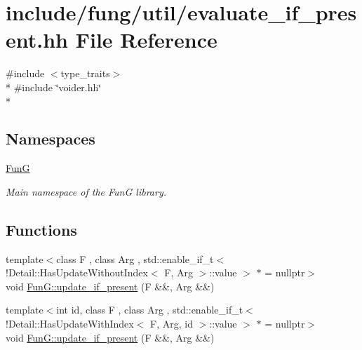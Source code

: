 \hypertarget{evaluate__if__present_8hh}{\section{include/fung/util/evaluate\-\_\-if\-\_\-present.hh File Reference}
\label{evaluate__if__present_8hh}
}
{\ttfamily \#include $<$type\-\_\-traits$>$}\\*
{\ttfamily \#include \char`\"{}voider.\-hh\char`\"{}}\\*
\subsection*{Namespaces}
\begin{DoxyCompactItemize}
\item 
\hyperlink{namespaceFunG}{Fun\-G}
\begin{DoxyCompactList}\small\item\em Main namespace of the Fun\-G library. \end{DoxyCompactList}\end{DoxyCompactItemize}
\subsection*{Functions}
\begin{DoxyCompactItemize}
\item 
{\footnotesize template$<$class F , class Arg , std\-::enable\-\_\-if\-\_\-t$<$!\-Detail\-::\-Has\-Update\-Without\-Index$<$ F, Arg $>$\-::value $>$ $\ast$  = nullptr$>$ }\\void \hyperlink{namespaceFunG_a3b9d2e5d07b30c2ee26703b33e9adb9e}{Fun\-G\-::update\-\_\-if\-\_\-present} (F \&\&, Arg \&\&)
\item 
{\footnotesize template$<$int id, class F , class Arg , std\-::enable\-\_\-if\-\_\-t$<$!\-Detail\-::\-Has\-Update\-With\-Index$<$ F, Arg, id $>$\-::value $>$ $\ast$  = nullptr$>$ }\\void \hyperlink{namespaceFunG_aed5ddbef97c98202e818bca2b74c75d2}{Fun\-G\-::update\-\_\-if\-\_\-present} (F \&\&, Arg \&\&)
\end{DoxyCompactItemize}
